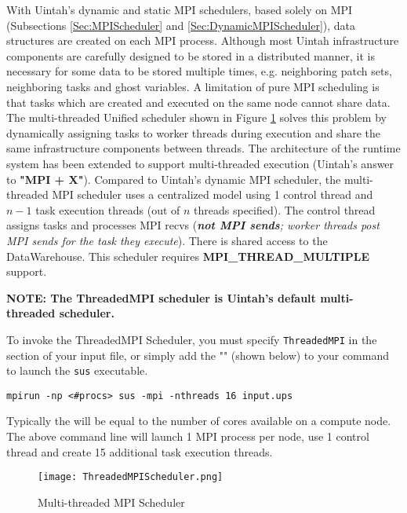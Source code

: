With Uintah's dynamic and static MPI schedulers, based solely on MPI
(Subsections \ref{Sec:MPIScheduler} and \ref{Sec:DynamicMPIScheduler}), data
structures are created on each MPI process. Although most Uintah
infrastructure components are carefully designed to be stored in a distributed
manner, it is necessary for some data to be stored multiple times, e.g.
neighboring patch sets, neighboring tasks and ghost variables. A limitation of
pure MPI scheduling is that tasks which are created and executed on the same
node cannot share data. The multi-threaded Unified scheduler shown in Figure
\ref{fig:UnifiedScheduler} solves this problem by dynamically assigning tasks
to worker threads during execution and share the same infrastructure components
between threads. The architecture of the runtime system has been extended to
support multi-threaded execution (Uintah's answer to \textbf{"MPI + X"}).
Compared to Uintah’s dynamic MPI scheduler, the multi-threaded MPI scheduler
uses a centralized model using 1 control thread and $n-1$ task execution
threads (out of $n$ threads specified). The control thread assigns tasks and
processes MPI recvs (\emph{\textbf{not MPI sends}; worker threads post MPI sends for the task they execute}). There is shared access to the DataWarehouse. This scheduler requires \textbf{MPI\_THREAD\_MULTIPLE} support.

\vspace{20pt}
\textbf{NOTE: The ThreadedMPI scheduler is Uintah's default multi-threaded scheduler.}
\vspace{20pt}

To invoke the ThreadedMPI Scheduler, you must specify \texttt{ThreadedMPI} in
the  section of your input file, or simply add the "" (shown below) to your command to launch the \texttt{sus}
executable.

\begin{Verbatim}[fontsize=\footnotesize]
mpirun -np <#procs> sus -mpi -nthreads 16 input.ups
\end{Verbatim}

Typically the  will be equal to the number of cores available on a
compute node. The above command line will launch 1 MPI process per node, use 1
control thread and create 15  additional task execution threads.

\begin{figure}[H]
  \centering
  \texttt{[image: ThreadedMPIScheduler.png]}
  \caption{Multi-threaded MPI Scheduler}
  \label{fig:UnifiedScheduler}
\end{figure}


